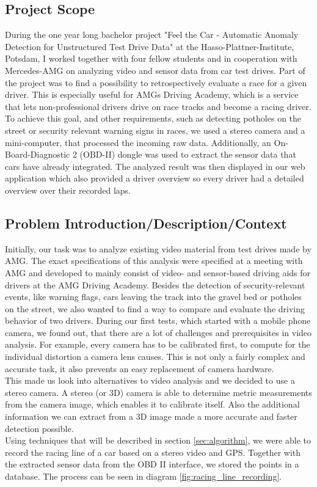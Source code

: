 \subsection{Project Scope}
During the one year long bachelor project "Feel the Car - Automatic Anomaly Detection for Unstructured Test Drive Data" at the Hasso-Plattner-Institute, Potsdam, I worked together with four fellow students and in cooperation with Mercedes-AMG on analyzing video and sensor data from car test drives.
Part of the project was to find a possibility to retrospectively evaluate a race for a given driver. This is especially useful for AMGs Driving Academy, which is a service that lets non-professional drivers drive on race tracks and become a racing driver. To achieve this goal, and other requirements, such as detecting potholes on the street or security relevant warning signs in races, we used a stereo camera and a mini-computer, that processed the incoming raw data.
Additionally, an On-Board-Diagnostic 2 (OBD-II) dongle was used to extract the sensor data that cars have already integrated.
The analyzed result was then displayed in our web application which also provided a driver overview so every driver had a detailed overview over their recorded laps.

\subsection{Problem Introduction/Description/Context}
Initially, our task was to analyze existing video material from test drives made by AMG. The exact specifications of this analysis were specified at a meeting with AMG and developed to mainly consist of video- and sensor-based driving aids for drivers at the AMG Driving Academy. Besides the detection of security-relevant events, like warning flags, cars leaving the track into the gravel bed or potholes on the street, we also wanted to find a way to compare and evaluate the driving behavior of two drivers.
During our first tests, which started with a mobile phone camera, we found out, that there are a lot of challenges and prerequisites in video analysis. For example, every camera has to be calibrated first, to compute for the individual distortion a camera lens causes. This is not only a fairly complex and accurate task, it also prevents an easy replacement of camera hardware.\\
This made us look into alternatives to video analysis and we decided to use a stereo camera. A stereo (or 3D) camera is able to determine metric measurements from the camera image, which enables it to calibrate itself. Also the additional information we can extract from a 3D image made a more accurate and faster detection possible.\\
Using techniques that will be described in section \ref{sec:algorithm}, we were able to record the racing line of a car based on a stereo video and GPS. Together with the extracted sensor data from the OBD II interface, we stored the points in a database. The process can be seen in diagram \ref{fig:racing_line_recording}.

